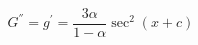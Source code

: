 \begin{equation}\label{Gp}
G^{''} = g^{'} = \frac{3\alpha}{1-\alpha}\sec^{2}{(x+c)}
\end{equation}

